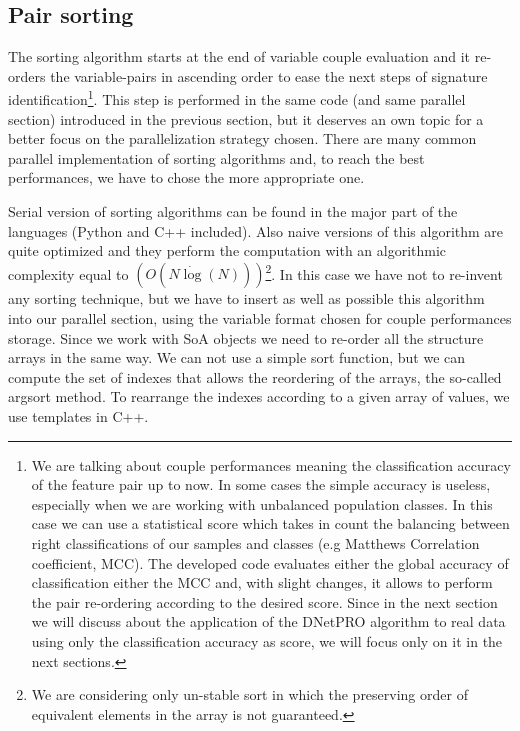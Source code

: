 \documentclass{standalone}
\begin{document}
\subsection[Sorting]{Pair sorting}\label{implementation:sort}

The sorting algorithm starts at the end of variable couple evaluation and it re-orders the variable-pairs in ascending order to ease the next steps of signature identification\footnote{
  We are talking about couple performances meaning the classification accuracy of the feature pair up to now.
  In some cases the simple accuracy is useless, especially when we are working with unbalanced population classes.
  In this case we can use a statistical score which takes in count the balancing between right classifications of our samples and classes (e.g Matthews Correlation coefficient, MCC).
  The developed code evaluates either the global accuracy of classification either the MCC and, with slight changes, it allows to perform the pair re-ordering according to the desired score.
  Since in the next section we will discuss about the application of the \textsf{DNetPRO} algorithm to real data using only the classification accuracy as score, we will focus only on it in the next sections.
}.
This step is performed in the same code (and same parallel section) introduced in the previous section, but it deserves an own topic for a better focus on the parallelization strategy chosen.
There are many common parallel implementation of sorting algorithms and, to reach the best performances, we have to chose the more appropriate one.

Serial version of sorting algorithms can be found in the major part of the languages (\textsf{Python} and \textsf{C++} included).
Also naive versions of this algorithm are quite optimized and they perform the computation with an algorithmic complexity equal to $(O(N\dot\log(N)))$\footnote{
  We are considering only un-stable sort in which the preserving order of equivalent elements in the array is not guaranteed.
}.
In this case we have not to re-invent any sorting technique, but we have to insert as well as possible this algorithm into our parallel section, using the variable format chosen for couple performances storage.
Since we work with SoA objects we need to re-order all the structure arrays in the same way.
We can not use a simple sort function, but we can compute the set of indexes that allows the reordering of the arrays, the so-called \textsf{argsort} method.
To rearrange the indexes according to a given array of values, we use \textsf{template}s in \textsf{C++}.
\end{document}
